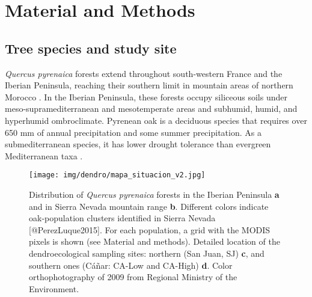 \section{Material and Methods}\label{sec:dendro:MatMet}
\subsection{Tree species and study site}\label{sec:dendro:StudyArea}
\emph{Quercus pyrenaica} forests extend throughout south-western France and the Iberian Peninsula, reaching their southern limit in mountain areas of northern Morocco \autocite{Franco1990Quercus}. In the Iberian Peninsula, these forests occupy siliceous soils under meso-supramediterranean and mesotemperate areas and subhumid, humid, and hyperhumid ombroclimate. Pyrenean oak is a deciduous species that requires over 650 mm of annual precipitation and some summer precipitation. As a submediterranean species, it has lower drought tolerance than evergreen Mediterranean taxa \autocite{delRioetal2007BioclimaticAnalysis}.

\begin{figure}
\centering
\texttt{[image: img/dendro/mapa\_situacion\_v2.jpg]} \caption{Distribution of \textit{Quercus pyrenaica} forests in the Iberian Peninsula \textbf{a} and in Sierra Nevada mountain range \textbf{b}. Different colors indicate oak-population clusters identified in Sierra Nevada [@PerezLuque2015]. For each population, a grid with the MODIS pixels is shown (see Material and methods). Detailed location of the dendroecological sampling sites: northern (San Juan, SJ) \textbf{c}, and southern ones (Cáñar: CA-Low and CA-High) \textbf{d}. Color orthophotography of 2009 from Regional Ministry of the Environment.}
\label{fig:map}
\end{figure}

